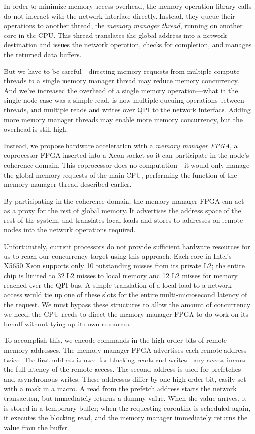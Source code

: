 \documentclass{acm_proc_article-sp}
\begin{document}
In order to minimize memory access overhead, the memory operation
library calls do not interact with the network interface
directly. Instead, they queue their operations to another thread, the
{\em memory manager thread}, running on another core in the CPU. This thread
translates the global address into a network destination and issues
the network operation, checks for completion, and manages the returned
data buffers.

But we have to be careful---directing memory requests from multiple
compute threads to a single memory manager thread may reduce memory
concurrency. And we've increased the overhead of a single memory
operation---what in the single node case was a simple read, is now
multiple queuing operations between threads, and multiple reads and
writes over QPI to the network interface. Adding more memory manager
threads may enable more memory concurrency, but the overhead is still high.

Instead, we propose hardware acceleration with a {\em memory manager
  FPGA}, a coprocessor FPGA inserted into a Xeon socket so it can
participate in the node's coherence domain. This coprocessor does no
computation---it would only manage the global memory requests of the
main CPU, performing the function of the memory manager thread
described earlier.

By participating in the coherence domain, the memory manager FPGA can
act as a proxy for the rest of global memory. It advertises the
address space of the rest of the system, and translates local loads
and stores to addresses on remote nodes into the network operations
required.

Unfortunately, current processors do not provide sufficient hardware
resources for us to reach our concurrency target using this
approach. Each core in Intel's X5650 Xeon supports only 10 outstanding
misses from its private L2; the entire chip is limited to 32 L2 misses
to local memory and 12 L2 misses for memory reached over the QPI
bus. A simple translation of a local load to a network access would
tie up one of these slots for the entire multi-microsecond latency of
the request. We must bypass these structures to allow the amount of
concurrency we need; the CPU needs to direct the memory manager FPGA
to do work on its behalf without tying up its own resources.

To accomplish this, we encode commands in the high-order bits of
remote memory addresses. The memory manager FPGA advertises each
remote address twice. The first address is used for blocking reads and
writes---any access incurs the full latency of the remote
access.  The second address is used for
prefetches and asynchronous writes. These addresses differ by one
high-order bit, easily set with a mask in a macro. A read from the
prefetch address starts the network transaction, but immediately
returns a dummy value. When the value arrives, it is stored in a
temporary buffer; when the requesting coroutine is scheduled again, it
executes the blocking read, and the memory manager immediately returns
the value from the buffer. 
\end{document}
